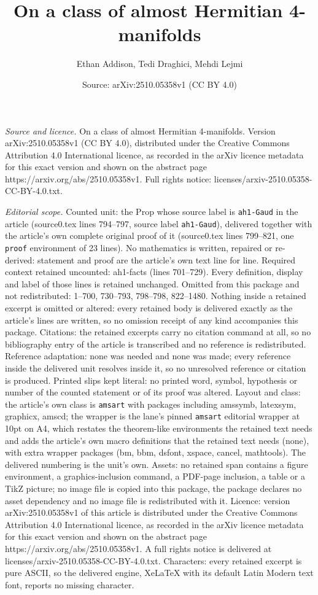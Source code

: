 \documentclass[10pt,a4paper]{amsart}
\title[On a class of almost Hermitian 4-manifolds]{On a class of almost Hermitian 4-manifolds}
\author{Ethan Addison, Tedi Draghici, Mehdi Lejmi}
\date{Source: arXiv:2510.05358v1 (CC BY 4.0)}
\begin{document}
\maketitle

\noindent\emph{Source and licence.} On a class of almost Hermitian 4-manifolds. Version arXiv:2510.05358v1 (CC BY 4.0), distributed under the Creative Commons Attribution 4.0 International licence, as recorded in the arXiv licence metadata for this exact version and shown on the abstract page https://arxiv.org/abs/2510.05358v1. Full rights notice: licenses/arxiv-2510.05358-CC-BY-4.0.txt.\par\smallskip

\noindent\textit{Editorial scope.} Counted unit: the Prop whose source label is \texttt{ah1-Gaud} in the article (source0.tex lines 794--797, source label \texttt{ah1-Gaud}), delivered together with the article's own complete original proof of it (source0.tex lines 799--821, one \texttt{proof} environment of 23 lines). No mathematics is written, repaired or re-derived: statement and proof are the article's own text line for line. Required context retained uncounted: ah1-facts (lines 701--729). Every definition, display and label of those lines is retained unchanged. Omitted from this package and not redistributed: 1--700, 730--793, 798--798, 822--1480. Nothing inside a retained excerpt is omitted or altered: every retained body is delivered exactly as the article's lines are written, so no omission receipt of any kind accompanies this package. Citations: the retained excerpts carry no citation command at all, so no bibliography entry of the article is transcribed and no reference is redistributed. Reference adaptation: none was needed and none was made; every reference inside the delivered unit resolves inside it, so no unresolved reference or citation is produced. Printed slips kept literal: no printed word, symbol, hypothesis or number of the counted statement or of its proof was altered. Layout and class: the article's own class is \texttt{amsart} with packages including amssymb, latexsym, graphicx, amscd; the wrapper is the lane's pinned \texttt{amsart} editorial wrapper at 10pt on A4, which restates the theorem-like environments the retained text needs and adds the article's own macro definitions that the retained text needs (none), with extra wrapper packages (bm, bbm, dsfont, xspace, cancel, mathtools). The delivered numbering is the unit's own. Assets: no retained span contains a figure environment, a graphics-inclusion command, a PDF-page inclusion, a table or a TikZ picture; no image file is copied into this package, the package declares no asset dependency and no image file is redistributed with it. Licence: version arXiv:2510.05358v1 of this article is distributed under the Creative Commons Attribution 4.0 International licence, as recorded in the arXiv licence metadata for this exact version and shown on the abstract page https://arxiv.org/abs/2510.05358v1. A full rights notice is delivered at licenses/arxiv-2510.05358-CC-BY-4.0.txt. Characters: every retained excerpt is pure ASCII, so the delivered engine, XeLaTeX with its default Latin Modern text font, reports no missing character.
\end{document}

